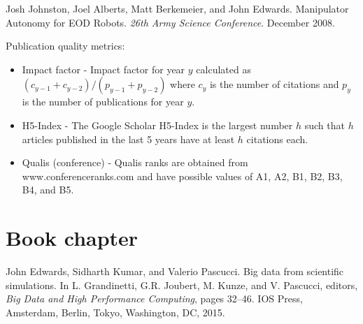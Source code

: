 \documentclass[margin,line]{res}
\newcommand{\pubunder}[1]{#1}
\newenvironment{tightitemize}{
\begin{itemize}
  \setlength{\itemsep}{1pt}
  \setlength{\parskip}{0pt}
  \setlength{\parsep}{0pt}
}{\end{itemize}
}
\begin{document}
\begin{resume}
Josh Johnston, Joel Alberts, Matt Berkemeier, and \pubunder{John Edwards}. Manipulator Autonomy for EOD Robots. \textit{26th Army Science Conference}. December 2008.

\begin{IMPACT}
\end{IMPACT}

Publication quality metrics:
\begin{tightitemize}
\item Impact factor - Impact factor for year $y$ calculated as $(c_{y-1}+c_{y-2})/(p_{y-1}+p_{y-2})$ where $c_y$ is the number of citations and $p_y$ is the number of publications for year $y$.
\item H5-Index - The Google Scholar H5-Index is the largest number $h$ such that $h$ articles published in the last 5 years have at least $h$ citations each.
\item Qualis (conference) - Qualis ranks are obtained from www.conferenceranks.com and have possible values of A1, A2, B1, B2, B3, B4, and B5.
\end{tightitemize}






\section{\sc Book chapter}

John Edwards, Sidharth Kumar, and Valerio Pascucci. Big data from scientific simulations. In L. Grandinetti, G.R. Joubert, M. Kunze, and V. Pascucci, editors, \textit{Big Data and High Performance Computing}, pages 32--46. IOS Press, Amsterdam, Berlin, Tokyo, Washington, DC, 2015.


\end{resume}
\end{document}
